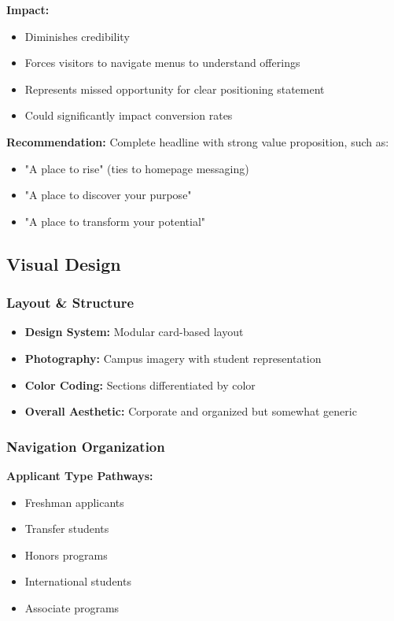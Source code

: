 \documentclass[12pt,letterpaper]{article}
\begin{document}
\textbf{Impact:}
\begin{itemize}[leftmargin=*]
    \item Diminishes credibility
    \item Forces visitors to navigate menus to understand offerings
    \item Represents missed opportunity for clear positioning statement
    \item Could significantly impact conversion rates
\end{itemize}

\textbf{Recommendation:}
Complete headline with strong value proposition, such as:
\begin{itemize}
    \item "A place to rise" (ties to homepage messaging)
    \item "A place to discover your purpose"
    \item "A place to transform your potential"
\end{itemize}

\subsection{Visual Design}

\subsubsection{Layout \& Structure}
\begin{itemize}[leftmargin=*]
    \item \textbf{Design System:} Modular card-based layout
    \item \textbf{Photography:} Campus imagery with student representation
    \item \textbf{Color Coding:} Sections differentiated by color
    \item \textbf{Overall Aesthetic:} Corporate and organized but somewhat generic
\end{itemize}

\subsubsection{Navigation Organization}

\textbf{Applicant Type Pathways:}
\begin{itemize}[leftmargin=*]
    \item Freshman applicants
    \item Transfer students
    \item Honors programs
    \item International students
    \item Associate programs
\end{itemize}
\end{document}
